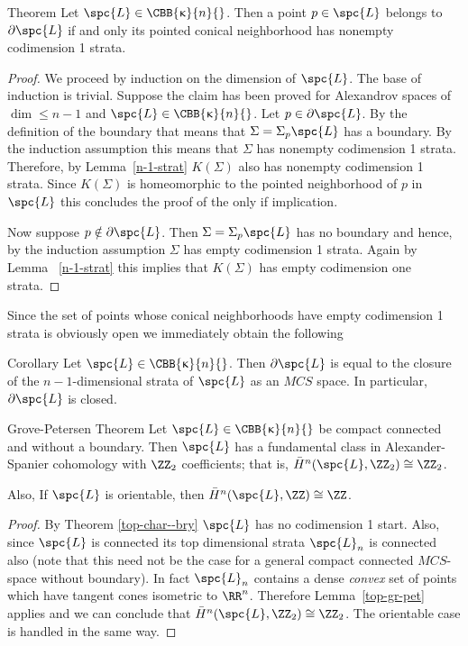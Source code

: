 \begin{thm}{Theorem}\label{top-char--bry}
Let $\spc{L}\in \CBB{\kappa}{n}{}$. Then a point $p\in \spc{L}$ belongs to $\partial \spc{L}$ if and only its pointed conical neighborhood has nonempty codimension 1 strata.
\end{thm}
\begin{proof}
We proceed by induction on the dimension of $\spc{L}$. The base of induction is trivial.
Suppose the claim has been proved for Alexandrov spaces of $\dim\le n-1$ and $\spc{L}\in \CBB{\kappa}{n}{}$. Let $p\in \partial \spc{L}$. By the definition of the boundary that means that $\Sigma=\Sigma_p\spc{L}$ has a boundary. By the induction assumption this means that $\Sigma$ has nonempty codimension 1 strata. Therefore, by Lemma~\ref{n-1-strat} $K(\Sigma)$ also has nonempty codimension 1 strata. Since $K(\Sigma)$ is homeomorphic to the pointed neighborhood of $p$ in $\spc{L}$ this concludes the proof of the only if implication.

Now suppose $p\notin \partial \spc{L}$. Then $\Sigma=\Sigma_p\spc{L}$ has no boundary and hence, by the induction assumption $\Sigma$ has empty codimension 1 strata. Again by Lemma ~\ref{n-1-strat} this implies that $K(\Sigma)$ has empty codimension one strata.
\end{proof}
Since  the set of points whose conical neighborhoods have empty codimension 1 strata is obviously open we immediately obtain the following
\begin{thm}{Corollary}\label{top=geom-bry}
Let $\spc{L}\in \CBB{\kappa}{n}{}$. Then $\partial \spc{L}$ is equal to the closure of the $n-1$-dimensional strata of $\spc{L}$ as an $MCS$ space. In particular,
$\partial \spc{L}$ is closed.
\end{thm}

\begin{thm}{Grove-Petersen Theorem}\label{grove-pet}
Let  $\spc{L}\in \CBB{\kappa}{n}{}$ be compact connected and without a boundary. 
Then $\spc{L}$ has a fundamental class in Alexander-Spanier cohomology with $\ZZ_2$ coefficients; that is, $\bar H^{n}(\spc{L},\ZZ_2)\cong \ZZ_2$. 

Also, If $\spc{L}$ is orientable, then   $\bar H^{n}(\spc{L},\ZZ)\cong \ZZ$. 


\end{thm}
\begin{proof}
By Theorem \ref{top-char--bry} $\spc{L}$ has no codimension 1 start. Also, since $\spc{L}$ is connected its top dimensional strata $\spc{L}_n$ is connected also (note that this need not be the case for a general  compact connected $MCS$-space without boundary). In fact $\spc{L}_n$ contains a dense {\it convex} set of points which have tangent cones isometric to $\RR^n$.
Therefore Lemma~\ref{top-gr-pet} applies 
and we can conclude that  $\bar H^{n}(\spc{L},\ZZ_2)\cong \ZZ_2$.
The orientable case is handled in the same way.
\end{proof}

